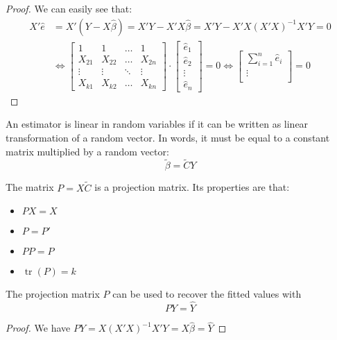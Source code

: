 \begin{proof}
We can easily see that:\begin{align*}
X'\hat e & = X'(Y - X\hat\beta) = X'Y - X'X\hat\beta = X'Y - X'X(X'X)^{-1}X'Y = 0 \\ & \Leftrightarrow
\begin{bmatrix}
    1 & 1 & \dots & 1 \\
    X_{21} & X_{22} & \dots & X_{2n} \\
    \vdots & \vdots & \ddots & \vdots \\
   X_{k1} & X_{k2} & \dots & X_{kn}
\end{bmatrix}
\cdot 
\begin{bmatrix}
    \hat e_{1}\\
    \hat e_{2}\\
    \vdots\\
    \hat e_{n}
\end{bmatrix} = 0 \Leftrightarrow \begin{bmatrix}
    \sum_{i=1}^{n}\hat e_{i}\\
    \vdots\\
\end{bmatrix} = 0
\end{align*}
\end{proof}

\begin{definition}
An estimator is linear in random variables if it can be written as linear transformation of a random vector. In words, it must be equal to a constant matrix multiplied by a random vector: $$\tilde{\beta} = \tilde{C}Y$$
\end{definition}

\begin{definition}
The matrix $P = X\tilde{C}$ is a projection matrix. Its properties are that:\begin{itemize}
\item $PX = X$
\item $P=P'$
\item $PP = P$
\item $\operatorname{tr}(P) = k$
\end{itemize} 
\end{definition}

\begin{remark}
The projection matrix $P$ can be used to recover the fitted values with $$PY = \hat Y$$
\end{remark}
\begin{proof}
We have $PY = X(X'X)^{-1}X'Y = X\hat\beta = \hat Y$
\end{proof}

